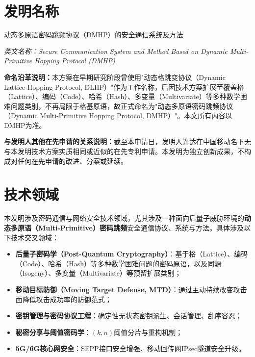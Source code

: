 ﻿\documentclass[12pt,a4paper]{article}
\begin{document}
\vspace{1cm}

\section{发明名称}

动态多原语密码跳频协议（DMHP）的安全通信系统及方法

\textit{英文名称：Secure Communication System and Method Based on Dynamic Multi-Primitive Hopping Protocol (DMHP)}

\textbf{命名沿革说明：}本方案在早期研究阶段曾使用"动态格跳变协议（Dynamic Lattice-Hopping Protocol, DLHP）"作为工作名称，后因技术方案扩展至覆盖格（Lattice）、编码（Code）、哈希（Hash）、多变量（Multivariate）等多种数学困难问题类别，不再局限于格基原语，故正式命名为"动态多原语密码跳频协议（Dynamic Multi-Primitive Hopping Protocol, DMHP）"。本文所有内容以DMHP为准。

\textbf{与发明人其他在先申请的关系说明：}截至本申请日，发明人许达在中国移动名下无与本发明技术方案实质相同或近似的在先专利申请。本发明为独立创新成果，不构成对任何在先申请的改进、分案或延续。

\section{技术领域}

本发明涉及密码通信与网络安全技术领域，尤其涉及一种面向后量子威胁环境的\textbf{动态多原语（Multi-Primitive）密码跳频}安全通信协议、系统与方法。具体涉及以下技术交叉领域：

\begin{itemize}[noitemsep]
    \item \textbf{后量子密码学（Post-Quantum Cryptography）}：基于格（Lattice）、编码（Code）、哈希（Hash）等多种数学困难问题的密码原语，以及同源（Isogeny）、多变量（Multivariate）等预留扩展类别；
    \item \textbf{移动目标防御（Moving Target Defense, MTD）}：通过主动持续改变攻击面降低攻击成功率的防御范式；
    \item \textbf{密钥管理与密码协议工程}：确定性无状态密钥派生、会话管理、乱序容忍；
    \item \textbf{秘密分享与阈值密码学}：$(k,n)$阈值分片与重构机制；
    \item \textbf{5G/6G核心网安全}：SEPP接口安全增强、移动回传网IPsec隧道安全升级。
\end{itemize}
\end{document}
